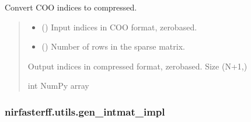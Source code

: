 \documentclass[letterpaper,10pt,english]{sphinxmanual}
\begin{document}
\begin{fulllineitems}
\label{\detokenize{_autosummary/nirfasterff.utils.compress_coo:nirfasterff.utils.compress_coo}}
\pysigstartsignatures
{}
\pysigstopsignatures
\sphinxAtStartPar
Convert COO indices to compressed.
\begin{quote}\begin{description}
\begin{itemize}
\item {} 
\sphinxAtStartPar
{} () \textendash{} Input indices in COO format, zero\sphinxhyphen{}based.

\item {} 
\sphinxAtStartPar
{} () \textendash{} Number of rows in the sparse matrix.

\end{itemize}

\sphinxAtStartPar
Output indices in compressed format, zero\sphinxhyphen{}based. Size (N+1,)

\sphinxAtStartPar
int NumPy array

\end{description}\end{quote}

\end{fulllineitems}


\sphinxstepscope


\subsubsection{nirfasterff.utils.gen\_intmat\_impl}
\label{\detokenize{_autosummary/nirfasterff.utils.gen_intmat_impl:nirfasterff-utils-gen-intmat-impl}}\label{\detokenize{_autosummary/nirfasterff.utils.gen_intmat_impl::doc}}
\end{document}
